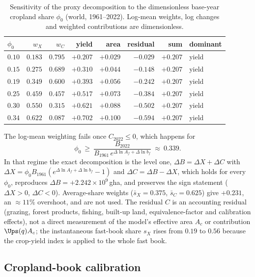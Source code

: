 \begin{table}[htbp]
\centering\small
\caption{Sensitivity of the proxy decomposition to the dimensionless base-year cropland share $\phi_0$ (world, 1961--2022). Log-mean weights, log changes and weighted contributions are dimensionless.}
\label{tab:si_phi0}
\begin{tabular}{l r r r r r r l}
\toprule
$\phi_0$ & $w_X$ & $w_C$ & yield & area & residual & sum & dominant \\
\midrule
$0.10$ & $0.183$ & $0.795$ & $+0.207$ & $+0.029$ & $-0.029$ & $+0.207$ & yield \\
$0.15$ & $0.275$ & $0.689$ & $+0.310$ & $+0.044$ & $-0.148$ & $+0.207$ & yield \\
$0.19$ & $0.349$ & $0.600$ & $+0.393$ & $+0.056$ & $-0.242$ & $+0.207$ & yield \\
$0.25$ & $0.459$ & $0.457$ & $+0.517$ & $+0.073$ & $-0.384$ & $+0.207$ & yield \\
$0.30$ & $0.550$ & $0.315$ & $+0.621$ & $+0.088$ & $-0.502$ & $+0.207$ & yield \\
$0.34$ & $0.622$ & $0.087$ & $+0.702$ & $+0.100$ & $-0.594$ & $+0.207$ & yield \\
\bottomrule
\end{tabular}
\end{table}

The log-mean weighting fails once $C_{2022}\le0$, which happens for
\begin{equation}
\phi_0\ \ge\ \frac{B_{2022}}{B_{1961}\,e^{\Delta\ln A_f+\Delta\ln b_f}}\ \approx\ 0.339 .
\end{equation}
In that regime the exact decomposition is the level one, $\Delta B=\Delta X+\Delta C$ with $\Delta X=\phi_0 B_{1961}(e^{\Delta\ln A_f+\Delta\ln b_f}-1)$ and $\Delta C=\Delta B-\Delta X$, which holds for every $\phi_0$, reproduces $\Delta B=+2.242\times10^{9}$\,gha, and preserves the sign statement ($\Delta X>0$, $\Delta C<0$). Average-share weights ($\bar s_X=0.375$, $\bar s_C=0.625$) give $+0.231$, an $\approx11\%$ overshoot, and are not used. The residual $C$ is an accounting residual (grazing, forest products, fishing, built-up land, equivalence-factor and calibration effects), not a direct measurement of the model's effective area $A_c$ or contribution $\Ups(q)A_c$; the instantaneous fast-book share $s_X$ rises from $0.19$ to $0.56$ because the crop-yield index is applied to the whole fast book.

\subsection{Cropland-book calibration}\label{si:cropland}

